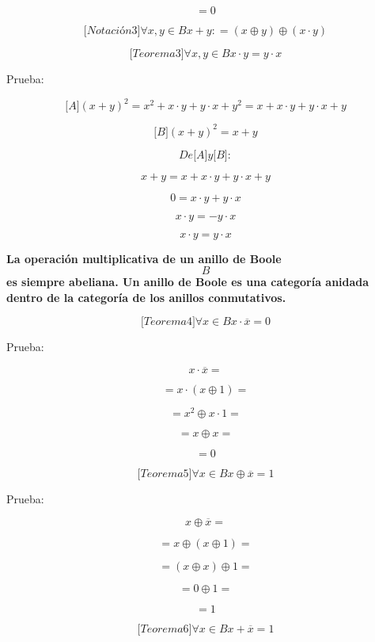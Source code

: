 \documentclass[
]{article}
\begin{document}
\begin{enumerate}
\begin{enumerate}
\begin{enumerate}
      \[= 0\]

      \[{\lbrack{{Notación}3}\rbrack}\forall x,{y \in B}{x + y}{: = \left( {x \oplus y} \right)} \oplus \left( {x \cdot y} \right)\]

      \[{\lbrack{{Teorema}3}\rbrack}\forall x,{y \in B}{{x \cdot y} = {y \cdot x}}\]

      Prueba:

      \[{\lbrack A\rbrack}{{\left( {x + y} \right)^{2} = {{{x^{2} + {x \cdot y}} + {y \cdot x}} + y^{2}}} = {{{x + {x \cdot y}} + {y \cdot x}} + y}}\]

      \[{\lbrack B\rbrack}{\left( {x + y} \right)^{2} = {x + y}}\]

      \[\mathit{De}{\lbrack A\rbrack}y{\lbrack B\rbrack}:\]

      \[{x + y} = {{{x + {x \cdot y}} + {y \cdot x}} + y}\]

      \[0 = {{x \cdot y} + {y \cdot x}}\]

      \[{x \cdot y} = {{- y} \cdot x}\]

      \[{x \cdot y} = {y \cdot x}\]

      \textbf{La operación multiplicativa de un anillo de Boole \[B\] es
      siempre abeliana. Un anillo de Boole es una categoría anidada
      dentro de la categoría de los anillos conmutativos.}

      \[{\lbrack{{Teorema}4}\rbrack}\forall{x \in B}{{x \cdot \overline{x}} = 0}\]

      Prueba:

      \[{x \cdot \overline{x}} =\]

      \[{= {x \cdot \left( {x \oplus 1} \right)}} =\]

      \[{= {x^{2} \oplus {x \cdot 1}}} =\]

      \[{= {x \oplus x}} =\]

      \[= 0\]

      \[{\lbrack{{Teorema}5}\rbrack}\forall{x \in B}x \oplus {\overline{x} = 1}\]

      Prueba:

      \[x \oplus {\overline{x} =}\]

      \[{= {x \oplus \left( {x \oplus 1} \right)}} =\]

      \[{= \left( {x \oplus x} \right)} \oplus {1 =}\]

      \[{= {0 \oplus 1}} =\]

      \[= 1\]

      \[{\lbrack{{Teorema}6}\rbrack}\forall{x \in B}{{x + \overline{x}} = 1}\]


\end{enumerate}
\end{enumerate}
\end{enumerate}
\end{document}

